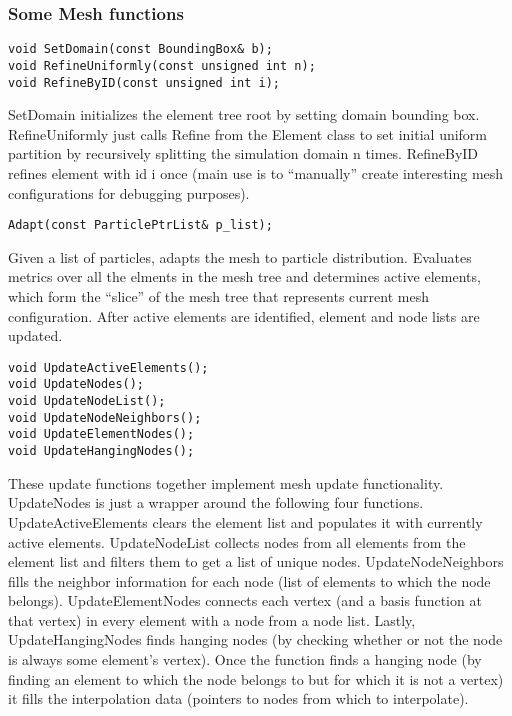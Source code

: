 \subsubsection{Some Mesh functions}
\begin{lstlisting}
void SetDomain(const BoundingBox& b);
void RefineUniformly(const unsigned int n);
void RefineByID(const unsigned int i);
\end{lstlisting}
SetDomain initializes the element tree root by setting domain bounding box. RefineUniformly just calls Refine from the 
Element class to set initial uniform partition by recursively splitting the simulation domain n times. RefineByID
refines element with id i once (main use is to ``manually'' create interesting mesh configurations for debugging purposes).
\begin{lstlisting}
Adapt(const ParticlePtrList& p_list);
\end{lstlisting}
Given a list of particles, adapts the mesh to particle distribution. Evaluates metrics over all the elments in the mesh tree 
and determines active elements, which form the ``slice'' of the mesh tree that represents current mesh configuration. After 
active elements are identified, element and node lists are updated.
\begin{lstlisting}
void UpdateActiveElements();
void UpdateNodes();
void UpdateNodeList();
void UpdateNodeNeighbors();
void UpdateElementNodes();
void UpdateHangingNodes();
\end{lstlisting}
These update functions together implement mesh update functionality. UpdateNodes is just a wrapper around the following 
four functions. UpdateActiveElements clears the element list and populates it with currently active elements.
UpdateNodeList collects nodes from all elements from the element list and filters them to get a list of unique nodes.
UpdateNodeNeighbors fills the neighbor information for each node (list of elements to which the node belongs).
UpdateElementNodes connects each vertex (and a basis function at that vertex) in every element with a node from a node list.
Lastly, UpdateHangingNodes finds hanging nodes (by checking whether or not the node is always some element's vertex).
Once the function finds a hanging node (by finding an element to which the node belongs to but for which it is not a vertex)
it fills the interpolation data (pointers to nodes from which to interpolate).
